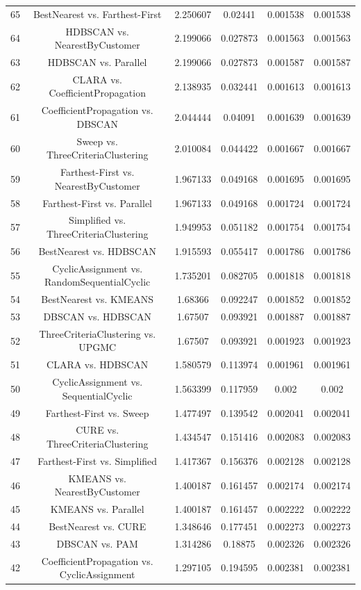 \documentclass[a4paper,10pt]{article}
\begin{document}
\begin{landscape}
\begin{table}[!htp]
\begin{tabular}{cccccc}
65&BestNearest vs. Farthest-First&2.250607&0.02441&0.001538&0.001538\\
64&HDBSCAN vs. NearestByCustomer&2.199066&0.027873&0.001563&0.001563\\
63&HDBSCAN vs. Parallel&2.199066&0.027873&0.001587&0.001587\\
62&CLARA vs. CoefficientPropagation&2.138935&0.032441&0.001613&0.001613\\
61&CoefficientPropagation vs. DBSCAN&2.044444&0.04091&0.001639&0.001639\\
60&Sweep vs. ThreeCriteriaClustering&2.010084&0.044422&0.001667&0.001667\\
59&Farthest-First vs. NearestByCustomer&1.967133&0.049168&0.001695&0.001695\\
58&Farthest-First vs. Parallel&1.967133&0.049168&0.001724&0.001724\\
57&Simplified vs. ThreeCriteriaClustering&1.949953&0.051182&0.001754&0.001754\\
56&BestNearest vs. HDBSCAN&1.915593&0.055417&0.001786&0.001786\\
55&CyclicAssignment vs. RandomSequentialCyclic&1.735201&0.082705&0.001818&0.001818\\
54&BestNearest vs. KMEANS&1.68366&0.092247&0.001852&0.001852\\
53&DBSCAN vs. HDBSCAN&1.67507&0.093921&0.001887&0.001887\\
52&ThreeCriteriaClustering vs. UPGMC&1.67507&0.093921&0.001923&0.001923\\
51&CLARA vs. HDBSCAN&1.580579&0.113974&0.001961&0.001961\\
50&CyclicAssignment vs. SequentialCyclic&1.563399&0.117959&0.002&0.002\\
49&Farthest-First vs. Sweep&1.477497&0.139542&0.002041&0.002041\\
48&CURE vs. ThreeCriteriaClustering&1.434547&0.151416&0.002083&0.002083\\
47&Farthest-First vs. Simplified&1.417367&0.156376&0.002128&0.002128\\
46&KMEANS vs. NearestByCustomer&1.400187&0.161457&0.002174&0.002174\\
45&KMEANS vs. Parallel&1.400187&0.161457&0.002222&0.002222\\
44&BestNearest vs. CURE&1.348646&0.177451&0.002273&0.002273\\
43&DBSCAN vs. PAM&1.314286&0.18875&0.002326&0.002326\\
42&CoefficientPropagation vs. CyclicAssignment&1.297105&0.194595&0.002381&0.002381\\

\end{tabular}
\end{table}
\end{landscape}
\end{document}
